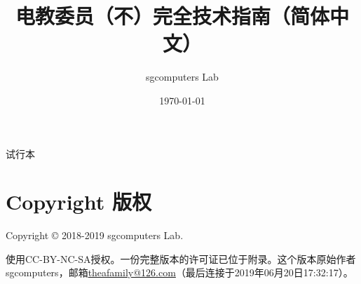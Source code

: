 \documentclass{book}
\begin{document}
\setcounter{tocdepth}{3}
\title{电教委员（不）完全技术指南（简体中文）}
\author{sgcomputers Lab}
\date{\today}
\maketitle
\begin{center}
	\Huge 试行本 \normalsize
\end{center}
\tableofcontents
\frontmatter
\section{Copyright 版权}
Copyright \copyright{} 2018-2019 sgcomputers Lab. \par
使用CC-BY-NC-SA授权。一份完整版本的许可证已位于附录。这个版本原始作者sgcomputers，邮箱\url{theafamily@126.com}（最后连接于2019年06月20日17:32:17）。\par
\large{\textbf{{\color{red}{对本文档所引起的任何后果不作担保！}}}}\normalsize\par
\end{document}
